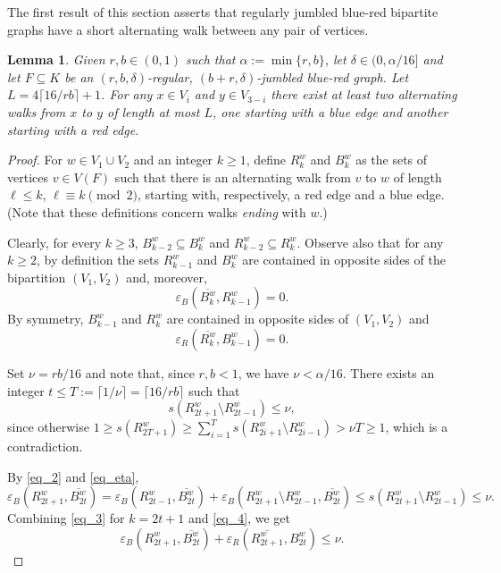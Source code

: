 \documentclass[12pt,reqno]{amsart}
\newcommand{\eps} {\varepsilon}
\newtheorem{lemma}[theorem]{Lemma}
\theoremstyle{definition}
\newcommand{\eb}{\eps_{B}}
\newcommand{\er}{\eps_{R}}
\newcommand{\rs}[1]{s(#1)}
\begin{document}
The first result of this section asserts that regularly jumbled blue-red bipartite graphs  have a short alternating walk between any pair of vertices.



\begin{lemma}
  \label{lem_walks}
	Given $r, b \in (0,1)$ such that $\alpha := \min \{r,b\}$, let $\delta \in (0,\alpha/16]$ and let $F \subseteq K$ be an $(r, b, \delta)$-regular, $(b + r, \delta)$-jumbled blue-red graph. Let $L = 4\lceil 16/rb \rceil + 1$.
For any  $x\in V_i$ and $y\in V_{3-i}$  there exist at least two alternating walks from $x$ to $y$ of length at most $L$, one starting with a blue edge and another starting with a red edge.
\end{lemma}


\begin{proof}
	For  $w \in V_1 \cup V_2$ and an integer $k \ge 1$, define $R^w_k$ and $B^w_k$ as  the sets of vertices $v\in V(F)$ such that there is an alternating walk from $v$ to $w$ of length $\ell \le k$, $\ell\equiv k \pmod{2}$, starting with, respectively, a red edge and a blue edge.
(Note that these definitions concern walks {\em ending} with $w$.)

 Clearly, for every $k\ge3$,  $B^w_{k-2}\subseteq B^w_k$ and $R^w_{k-2}\subseteq R^w_k$.
 Observe also that for any $k \geq 2$, by definition the sets  $R^w_{k-1}$ and $B^w_k$ are contained in opposite sides of the bipartition $(V_1,V_2)$ and, moreover,
\begin{equation}
  \eb(\overline{B^w_k}, R^w_{k-1}) = 0.
\label{eq_2}
\end{equation}
By symmetry, $B_{k-1}^w$ and $R_k^w$ are contained in opposite sides of $(V_1,V_2)$ and
 \begin{equation}
	 \er(\overline{R^w_k}, B^w_{k-1}) = 0.
\label{eq_3}
\end{equation}

 Set $\nu = rb/16$ and note that, since $r,b < 1$, we have $\nu < \alpha/16$.
There exists an integer $t\leq T := \lceil 1/\nu \rceil = \lceil 16/rb \rceil$ such that
\begin{equation}
  \label{eq_eta}
\rs{R^w_{2t + 1}\setminus R^w_{2t - 1}}\leq \nu,
\end{equation}
since otherwise $1 \ge \rs{R^w_{2T + 1}} \ge \sum_{i = 1}^{T}  \rs{R^w_{2i+1} \setminus R^w_{2i-1}}  > \nu T \ge 1$, which is a contradiction.


By \eqref{eq_2} and \eqref{eq_eta},
 \begin{equation}
	 \eb(R^w_{2t+1}, \overline{B^w_{2t}}) = \eb(R^w_{2t - 1},\overline{B^w_{2t}})+ \eb(R^w_{2t + 1}\setminus R^w_{2t - 1}, \overline{B^w_{2t}})\leq\rs{R^w_{2t + 1}\setminus R^w_{2t - 1}}\leq \nu.
\label{eq_4}
\end{equation}
Combining \eqref{eq_3} for $k = 2t + 1$ and \eqref{eq_4}, we get
\begin{equation}
  \label{ass}
	\eb(R^w_{2t + 1}, \overline{B^w_{2t}})+ \er(\overline{R^w_{2t + 1}}, B^w_{2t}) \leq \nu.
\end{equation}



\end{proof}
\end{document}
